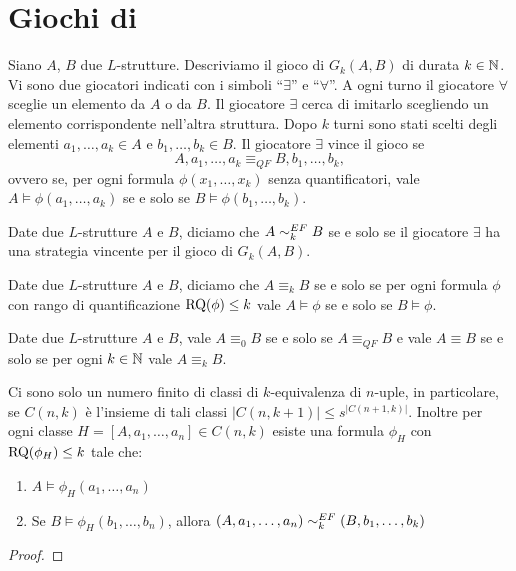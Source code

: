 \section{Giochi di \EFl{}}
\label{sec:EF}
\begin{definizione}
 Siano $A$, $B$ due $L$-strutture. Descriviamo
 il gioco di \EFl{} $G_k(A,B)$ di durata $k \in \mathbb{N}$. Vi sono due giocatori
 indicati con i simboli ``$\exists$'' e ``$\forall$''. A ogni turno
 il giocatore $\forall$ sceglie un elemento da $A$ o da $B$. Il giocatore
 $\exists$ cerca di imitarlo scegliendo un elemento corrispondente nell'altra
 struttura. Dopo $k$ turni sono stati scelti degli elementi
 $a_1, \ldots, a_k \in A$ e $b_1, \ldots, b_k \in B$. Il giocatore $\exists$
 vince il gioco se
 \[ A, a_1, \ldots, a_k \equiv_{QF} B, b_1, \ldots, b_k,\]
 ovvero se, per ogni formula $\phi(x_1, \ldots, x_k)$ senza quantificatori, vale
 $A \models \phi(a_1, \ldots, a_k)$ se e solo se $B \models \phi(b_1, \ldots, b_k)$.
\end{definizione}

\begin{definizione}
 Date due $L$-strutture $A$ e $B$, diciamo che $A \sim^{EF}_k B$ se e solo se
 il giocatore $\exists$ ha una strategia vincente per il gioco di \EF{} $G_k(A,B)$.
\end{definizione}

\begin{definizione}
 Date due $L$-strutture $A$ e $B$, diciamo che $A \equiv_k B$ se e solo se
 per ogni formula $\phi$ con rango di quantificazione $\operatorname{RQ}(\phi) \leq k$ vale
 $A \models \phi$ se e solo se $B \models \phi$.
\end{definizione}

\begin{osservazione}
 Date due $L$-strutture $A$ e $B$, vale $A \equiv_0 B$ se e solo se
 $A \equiv_{QF} B$ e vale $A \equiv B$ se e solo se per ogni $k \in \mathbb{N}$ vale
 $A \equiv_k B$.
\end{osservazione}

\begin{lemma}
\label{lemma:finite-formulas}
 Ci sono solo un numero finito di classi di $k$-equivalenza di $n$-uple,
 in particolare, se $C(n,k)$
 è l'insieme di tali classi $|C(n,k+1)| \leq s^{|C(n+1,k)|}$. Inoltre per ogni
 classe $H=[A,a_1,\ldots,a_n] \in C(n,k)$ esiste una formula $\phi_H$
 con $\operatorname{RQ}(\phi_H) \leq k$ tale che:
 \begin{enumerate}
  \item $A \models \phi_H(a_1, \ldots, a_n)$
  \item Se $B \models \phi_H(b_1,\ldots,b_n)$, allora $(A,a_1,\ldots, a_n) \sim^{EF}_k (B,b_1,\ldots,b_k)$
 \end{enumerate}
\end{lemma}
\begin{proof}
\end{proof}

